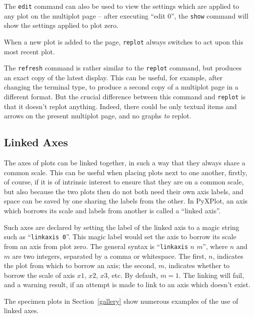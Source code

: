 \documentclass[a4paper,onecolumn,11pt]{book}
\begin{document}
The \texttt{edit} command can also be used to view the settings which are
applied to any plot on the multiplot page -- after executing ``edit 0'', the
\texttt{show} command will show the settings applied to plot zero.

When a new plot is added to the page, \texttt{replot} always switches to act
upon this most recent plot.

 The \texttt{refresh} command is
rather similar to the \texttt{replot} command, but produces an exact copy of
the latest display. This can be useful, for example, after changing the
terminal type, to produce a second copy of a multiplot page in a different
format. But the crucial difference between this command and \texttt{replot} is
that it doesn't replot anything. Indeed, there could be only textual items and
arrows on the present multiplot page, and no graphs \textit{to} replot.

\subsection{Linked Axes}

The axes of plots can be linked together, in such a way that they always share
a common scale. This can be useful when placing plots next to one another,
firstly, of course, if it is of intrinsic interest to ensure that they are on a
common scale, but also because the two plots then do not both need their own
axis labels, and space can be saved by one sharing the labels from the other.
In PyXPlot, an axis which borrows its scale and labels from another is called a
``linked axis''.

Such axes are declared by setting the label of the linked axis to a magic
string such as ``\texttt{linkaxis 0}''\label{linked_axes}. This magic label would set the axis to borrow
its scale from an axis from plot zero. The general syntax is
``\texttt{linkaxis} $n$ $m$'', where $n$ and $m$ are two integers, separated by
a comma or whitespace. The first, $n$, indicates the plot from which to borrow
an axis; the second, $m$, indicates whether to borrow the scale of axis $x1$,
$x2$, $x3$, etc. By default, $m=1$. The linking will fail, and a warning
result, if an attempt is made to link to an axis which doesn't exist.

The specimen plots in Section~\ref{gallery} show numerous examples of the use
of linked axes.
\end{document}
